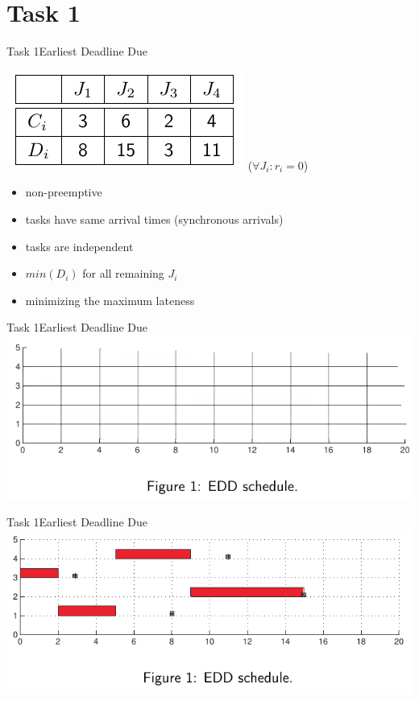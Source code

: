 
\section{Task 1}

\setcounter{task}{1}

\begin{frame}{Task 1}{Earliest Deadline Due}
  \vspace{0.5cm}
  \begin{task}
    \centering
    \includegraphics[height=0.2\paperheight]{./figures/1_tab.png}
    ($\forall J_i: r_i = 0$)
  \end{task}
  \begin{requirements}
    \begin{itemize}
      \item \alert{non-preemptive}
      \item tasks have \alert{same arrival times} (synchronous arrivals)
      \item tasks are \alert{independent}
      \item $min(D_i)$ for all remaining $J_i$
      \item \alert{minimizing} the \alert{maximum lateness}
    \end{itemize}
    \centering
  \end{requirements}
\end{frame}

\begin{frame}{Task 1}{Earliest Deadline Due}
  \includegraphics[width=\textwidth]{./figures/1_empty.png}
\end{frame}

\begin{frame}{Task 1}{Earliest Deadline Due}
  \includegraphics[width=\textwidth]{./figures/1_sol.png}
\end{frame}
